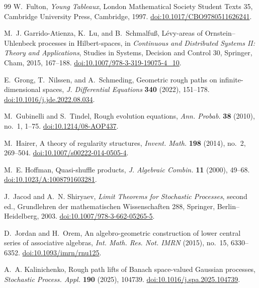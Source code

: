 \documentclass[10pt,reqno]{amsart}
\theoremstyle{plain}
\theoremstyle{definition}
\theoremstyle{remark}
\begin{document}
\begin{thebibliography}{99}
W.~Fulton,
\emph{Young Tableaux}, London Mathematical Society Student Texts 35,
Cambridge University Press, Cambridge, 1997.
\href{https://doi.org/10.1017/CBO9780511626241}
{doi:10.1017/CBO9780511626241}.

M.~J. Garrido-Atienza, K.~Lu, and B.~Schmalfu\ss,
L\'evy-areas of Ornstein--Uhlenbeck processes in Hilbert-spaces,
in \emph{Continuous and Distributed Systems II: Theory and Applications},
Studies in Systems, Decision and Control 30, Springer, Cham, 2015,
167--188.
\href{https://doi.org/10.1007/978-3-319-19075-4_10}
{doi:10.1007/978-3-319-19075-4\_10}.

E.~Grong, T.~Nilssen, and A.~Schmeding,
Geometric rough paths on infinite-dimensional spaces,
\emph{J. Differential Equations} \textbf{340} (2022), 151--178.
\href{https://doi.org/10.1016/j.jde.2022.08.034}
{doi:10.1016/j.jde.2022.08.034}.

M.~Gubinelli and S.~Tindel,
Rough evolution equations,
\emph{Ann. Probab.} \textbf{38} (2010), no.~1, 1--75.
\href{https://doi.org/10.1214/08-AOP437}
{doi:10.1214/08-AOP437}.

M.~Hairer,
A theory of regularity structures,
\emph{Invent. Math.} \textbf{198} (2014), no.~2, 269--504.
\href{https://doi.org/10.1007/s00222-014-0505-4}
{doi:10.1007/s00222-014-0505-4}.

M.~E. Hoffman,
Quasi-shuffle products,
\emph{J. Algebraic Combin.} \textbf{11} (2000), 49--68.
\href{https://doi.org/10.1023/A:1008791603281}
{doi:10.1023/A:1008791603281}.

J.~Jacod and A.~N. Shiryaev,
\emph{Limit Theorems for Stochastic Processes}, second ed.,
Grundlehren der mathematischen Wissenschaften 288, Springer,
Berlin--Heidelberg, 2003.
\href{https://doi.org/10.1007/978-3-662-05265-5}
{doi:10.1007/978-3-662-05265-5}.

D.~Jordan and H.~Orem,
An algebro-geometric construction of lower central series of associative
algebras,
\emph{Int. Math. Res. Not. IMRN} (2015), no.~15, 6330--6352.
\href{https://doi.org/10.1093/imrn/rnu125}
{doi:10.1093/imrn/rnu125}.

A.~A. Kalinichenko,
Rough path lifts of Banach space-valued Gaussian processes,
\emph{Stochastic Process. Appl.} \textbf{190} (2025), 104739.
\href{https://doi.org/10.1016/j.spa.2025.104739}
{doi:10.1016/j.spa.2025.104739}.


\end{thebibliography}
\end{document}
